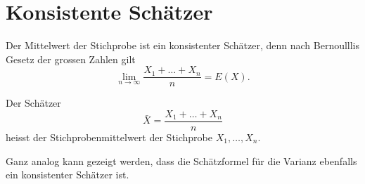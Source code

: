 \section{Konsistente Schätzer} \label{section-konsistente-schaetzer}
Der Mittelwert der Stichprobe ist ein konsistenter Schätzer,
denn nach Bernoulllis Gesetz der grossen Zahlen gilt
\begin{equation}
\lim_{n\to\infty}\frac{X_1+\dots+X_n}{n}=E(X).
\end{equation}
\begin{definition}
Der Schätzer
\begin{equation}
\bar X=\frac{X_1+\dots+X_n}{n}
\end{equation}
heisst der Stichprobenmittelwert der Stichprobe $X_1,\dots,X_n$.
\end{definition}
Ganz analog kann gezeigt werden, dass die Schätzformel für die
Varianz ebenfalls ein konsistenter Schätzer ist.

